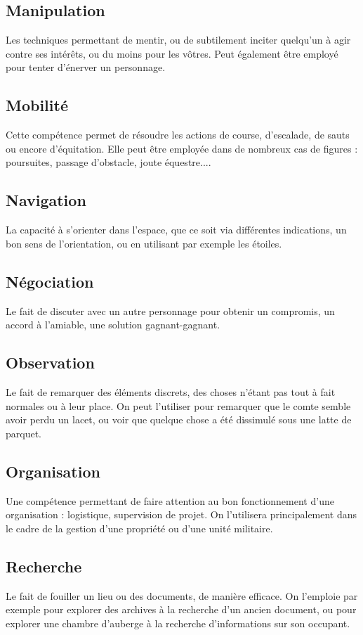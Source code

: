 \documentclass[10pt,a4paper]{book}
\begin{document}
\begin{multicols}{2}
\subsection*{Manipulation}Les techniques permettant de mentir, ou de subtilement inciter quelqu'un à agir contre ses intérêts, ou du moins pour les vôtres. Peut également être employé pour tenter d'énerver un personnage.
\subsection*{Mobilité} Cette compétence permet de résoudre les actions de course, d'escalade, de sauts ou encore d'équitation. Elle peut être employée dans de nombreux cas de figures : poursuites, passage d'obstacle, joute équestre.... 
\subsection*{Navigation} La capacité à s'orienter dans l'espace, que ce soit via différentes indications, un bon sens de l'orientation, ou en utilisant par exemple les étoiles.
\subsection*{Négociation} Le fait de discuter avec un autre personnage pour obtenir un compromis, un accord à l'amiable, une solution gagnant-gagnant.
\subsection*{Observation}Le fait de remarquer des éléments discrets, des choses n'étant pas tout à fait normales ou à leur place. On peut l'utiliser pour remarquer que le comte semble avoir perdu un lacet, ou voir que quelque chose a été dissimulé sous une latte de parquet.
\subsection*{Organisation} Une compétence permettant de faire attention au bon fonctionnement d'une organisation : logistique, supervision de projet. On l'utilisera principalement dans le cadre de la gestion d'une propriété ou d'une unité militaire.
\subsection*{Recherche}Le fait de fouiller un lieu ou des documents, de manière efficace. On l'emploie par exemple pour explorer des archives à la recherche d'un ancien document, ou pour explorer une chambre d'auberge à la recherche d'informations sur son occupant.

\end{multicols}
\end{document}
